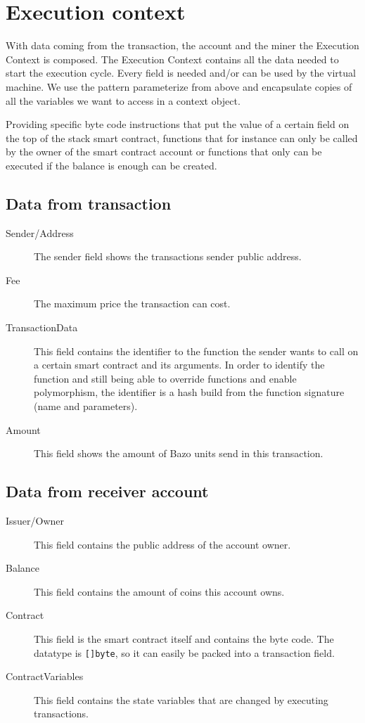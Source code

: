 \section{Execution context}
With data coming from the transaction, the account and the miner the Execution Context is composed. The Execution Context contains all the data needed to start the execution cycle. Every field is needed and/or can be used by the virtual machine. We use the pattern parameterize from above and encapsulate copies of all the variables we want to access in a context object.

Providing specific byte code instructions that put the value of a certain field on the top of the stack smart contract, functions that for instance can only be called by the owner of the smart contract account or functions that only can be executed if the balance is enough can be created.

\subsection{Data from transaction}
\begin{description}
  \item[Sender/Address] The sender field shows the transactions sender public address.
  \item[Fee] The maximum price the transaction can cost.
  \item[TransactionData] This field contains the identifier to the function the sender wants to call on a certain smart contract and its arguments. In order to identify the function and still being able to override functions and enable polymorphism, the identifier is a hash build from the function signature (name and parameters).
  \item[Amount] This field shows the amount of Bazo units send in this transaction.
\end{description}

\subsection{Data from receiver account}
\begin{description}
  \item[Issuer/Owner] This field contains the public address of the account owner.
  \item[Balance] This field contains the amount of coins this account owns.
  \item[Contract] This field is the smart contract itself and contains the byte code. The datatype is \texttt{[]byte}, so it can easily be packed into a transaction field.
  \item[ContractVariables] This field contains the state variables that are changed by executing transactions.
\end{description}

